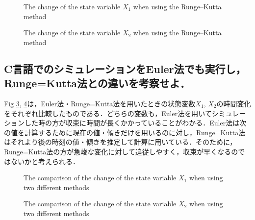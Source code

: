 \documentclass[a4paper,10pt,twocolumn,fleqn]{jarticle}
\begin{document}
    \begin{figure}[htbp]
      \begin{center}
        \caption{The change of the state variable $X_1$ when using the Runge–Kutta method}
        \label{RungeX1}
      \end{center}
    \end{figure}

    \begin{figure}[htbp]
      \begin{center}
        \caption{The change of the state variable $X_2$ when using the Runge–Kutta method}
        \label{RungeX2}
      \end{center}
    \end{figure}

  \subsection{C言語でのシミュレーションをEuler法でも実行し，Runge=Kutta法との違いを考察せよ．}


    Fig \ref{EulerX1}, \ref{EulerX2}は，Euler法・Runge=Kutta法を用いたときの状態変数$X_1$, $X_2$の時間変化をそれぞれ比較したものである．どちらの変数も，Euler法を用いてシミュレーションした時の方が収束に時間が長くかかっていることがわかる．Euler法は次の値を計算するために現在の値・傾きだけを用いるのに対し，Runge=Kutta法はそれより後の時刻の値・傾きを推定して計算に用いている．そのために，Runge=Kutta法の方が急峻な変化に対して追従しやすく，収束が早くなるのではないかと考えられる．

    \begin{figure}[htbp]
      \begin{center}
        \caption{The comparison of the change of the state variable $X_1$ when using two different methods}
        \label{EulerX1}
      \end{center}
    \end{figure}

    \begin{figure}[htbp]
      \begin{center}
        \caption{The comparison of the change of the state variable $X_2$ when using two different methods}
        \label{EulerX2}
      \end{center}
    \end{figure}
\end{document}
